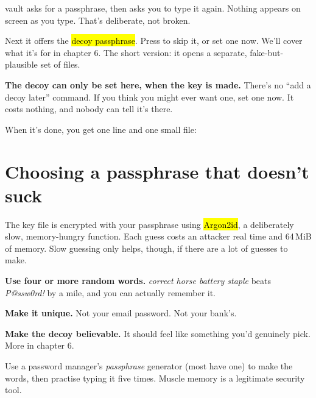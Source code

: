 \documentclass[10pt,oneside,openany]{book}
\begin{document}
vault asks for a passphrase, then asks you to type it again. Nothing appears
on screen as you type. That's deliberate, not broken.


Next it offers the \hl{decoy passphrase}. Press  to skip it, or
set one now. We'll cover what it's for in chapter 6. The short version: it
opens a separate, fake-but-plausible set of files.


\begin{headsup}
\textbf{The decoy can only be set here, when the key is made.} There's no
``add a decoy later'' command. If you think you might ever want one, set one
now. It costs nothing, and nobody can tell it's there.
\end{headsup}

When it's done, you get one line and one small file:


\section{Choosing a passphrase that doesn't suck}

The key file is encrypted with your passphrase using \hl{Argon2id}, a
deliberately slow, memory-hungry function. Each guess costs an attacker real
time and 64\,MiB of memory. Slow guessing only helps, though, if there are a lot
of guesses to make.

\begin{checks}
  \item \textbf{Use four or more random words.} \emph{correct horse battery
        staple} beats \emph{P@ssw0rd!} by a mile, and you can actually remember it.
  \item \textbf{Make it unique.} Not your email password. Not your bank's.
  \item \textbf{Make the decoy believable.} It should feel like something
        you'd genuinely pick. More in chapter 6.
\end{checks}

\begin{quickwin}
Use a password manager's \emph{passphrase} generator (most have one) to make
the words, then practise typing it five times. Muscle memory is a legitimate
security tool.
\end{quickwin}
\end{document}
